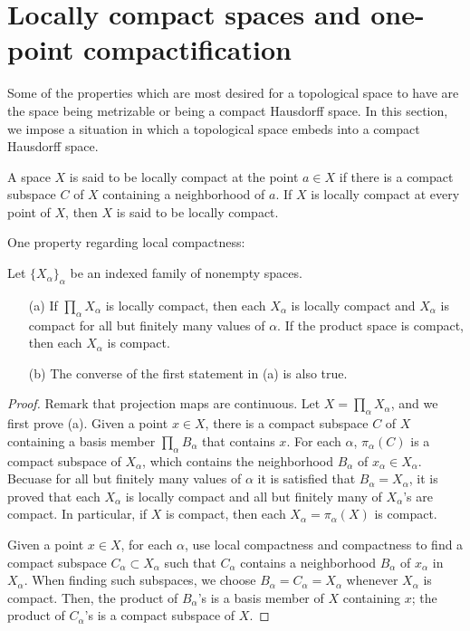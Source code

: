 \section{Locally compact spaces and one-point compactification}

Some of the properties which are most desired for a topological space to have are the space being metrizable or being a compact Hausdorff space.
In this section, we impose a situation in which a topological space embeds into a compact Hausdorff space.

\begin{defi}
    A space $X$ is said to be locally compact at the point $a\in X$ if there is a compact subspace $C$ of $X$ containing a neighborhood of $a$.
    If $X$ is locally compact at every point of $X$, then $X$ is said to be locally compact.
\end{defi}

One property regarding local compactness:
\begin{prop}
    Let $\{X_\alpha\}_\alpha$ be an indexed family of nonempty spaces.
    \begin{enumerate}
        \item[(a)]
        {
            If $\prod_\alpha X_\alpha$ is locally compact, then each $X_\alpha$ is locally compact and $X_\alpha$ is compact for all but finitely many values of $\alpha$.
            If the product space is compact, then each $X_\alpha$ is compact.
        }
        \item[(b)]
        {
            The converse of the first statement in (a) is also true.
        }
    \end{enumerate}
\end{prop}
\begin{proof}
    Remark that projection maps are continuous.
    Let $X=\prod_\alpha X_\alpha$, and we first prove (a).
    Given a point $x\in X$, there is a compact subspace $C$ of $X$ containing a basis member $\prod_\alpha B_\alpha$ that contains $x$.
    For each $\alpha$, $\pi_\alpha(C)$ is a compact subspace of $X_\alpha$, which contains the neighborhood $B_\alpha$ of $x_\alpha\in X_\alpha$.
    Becuase for all but finitely many values of $\alpha$ it is satisfied that $B_\alpha=X_\alpha$, it is proved that each $X_\alpha$ is locally compact and all but finitely many of $X_\alpha$'s are compact.
    In particular, if $X$ is compact, then each $X_\alpha=\pi_\alpha(X)$ is compact.
    
    Given a point $x\in X$, for each $\alpha$, use local compactness and compactness to find a compact subspace $C_\alpha\subset X_\alpha$ such that $C_\alpha$ contains a neighborhood $B_\alpha$ of $x_\alpha$ in $X_\alpha$.
    When finding such subspaces, we choose $B_\alpha=C_\alpha=X_\alpha$ whenever $X_\alpha$ is compact.
    Then, the product of $B_\alpha$'s is a basis member of $X$ containing $x$; the product of $C_\alpha$'s is a compact subspace of $X$.
\end{proof}

